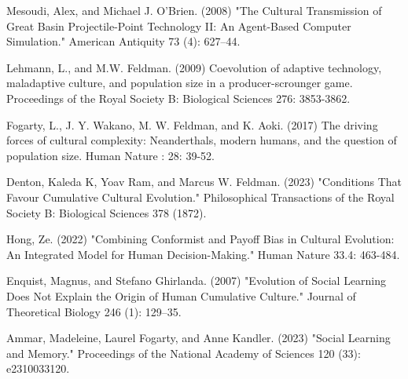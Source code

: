 \documentclass[12pt]{extarticle}
\begin{document}
\begin{thebibliography}{}
Mesoudi, Alex, and Michael J. O’Brien. (2008) "The Cultural Transmission of Great Basin Projectile-Point Technology II: An Agent-Based Computer Simulation." American Antiquity 73 (4): 627–44. 

Lehmann, L., and M.W. Feldman. (2009) Coevolution of adaptive technology, maladaptive culture, and population size in a producer-scrounger game. Proceedings of the Royal Society B: Biological Sciences 276: 3853-3862.

Fogarty, L., J. Y. Wakano, M. W. Feldman, and K. Aoki. (2017) The driving forces of cultural complexity: Neanderthals, modern humans, and the question of population size. Human Nature : 28: 39-52.

Denton, Kaleda K, Yoav Ram, and Marcus W. Feldman. (2023) "Conditions That Favour Cumulative Cultural Evolution." Philosophical Transactions of the Royal Society B: Biological Sciences 378 (1872).

Hong, Ze. (2022) "Combining Conformist and Payoff Bias in Cultural Evolution: An Integrated Model for Human Decision-Making." Human Nature 33.4: 463-484.

 Enquist, Magnus, and Stefano Ghirlanda. (2007) "Evolution of Social Learning Does Not Explain the Origin of Human Cumulative Culture." Journal of Theoretical Biology 246 (1): 129–35.

Ammar, Madeleine, Laurel Fogarty, and Anne Kandler. (2023) "Social Learning and Memory." Proceedings of the National Academy of Sciences 120 (33): e2310033120. 

\end{thebibliography}

\pagebreak
\end{document}
